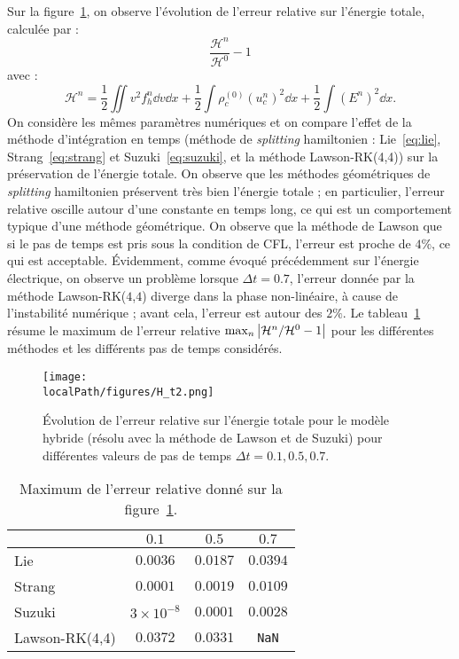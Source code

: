 Sur la figure~\ref{fig:H:t2}, on observe l'évolution de l'erreur relative sur l'énergie totale, calculée par :
\begin{equation}
	\frac{\mathcal{H}^n}{\mathcal{H}^0}-1
	\label{eq:relativeerror:H}
\end{equation}
avec :
$$
  \mathcal{H}^n = \frac{1}{2}\iint v^2f_h^n\dd{v}\dd{x}
                + \frac{1}{2}\int\rho_c^{(0)}\left(u_c^n\right)^2\dd{x}
                + \frac{1}{2}\int\left(E^n\right)^2\dd{x}.
$$
On considère les mêmes paramètres numériques et on compare l'effet de la méthode d'intégration en temps (méthode de \emph{splitting} hamiltonien : Lie~\eqref{eq:lie}, Strang~\eqref{eq:strang} et Suzuki~\eqref{eq:suzuki}, et la méthode Lawson-RK(4,4)) sur la préservation de l'énergie totale. On observe que les méthodes géométriques de \emph{splitting} hamiltonien préservent très bien l'énergie totale ; en particulier, l'erreur relative oscille autour d'une constante en temps long, ce qui est un comportement typique d'une méthode géométrique. On observe que la méthode de Lawson que si le pas de temps est pris sous la condition de CFL, l'erreur est proche de $4\%$, ce qui est acceptable. Évidemment, comme évoqué précédemment sur l'énergie électrique, on observe un problème lorsque $\Delta t=0.7$, l'erreur donnée par la méthode Lawson-RK($4$,$4$) diverge dans la phase non-linéaire, à cause de l'instabilité numérique ; avant cela, l'erreur est autour des $2\%$. Le tableau~\ref{tab:H:max} résume le maximum de l'erreur relative $\max_n \left| {\cal H}^n / {\cal H}^0 -1 \right|$ pour les différentes méthodes et les différents pas de temps considérés.

\begin{figure}[h]
  \centering
  \texttt{[image: \\localPath/figures/H\_t2.png]}
  \caption{Évolution de l'erreur relative sur l'énergie totale pour le modèle hybride (résolu avec la méthode de Lawson et de Suzuki) pour différentes valeurs de pas de temps $\Delta t=0.1,0.5,0.7$.}
  \label{fig:H:t2}
\end{figure}

\begin{table}[h]
  \centering
  \begin{tabular}{l|c|c|c}
                   & $0.1$             & $0.5$     & $0.7$        \\
    \hline
    Lie            & $0.0036$          & $0.0187$  & $0.0394$     \\
    Strang         & $0.0001$          & $0.0019$  & $0.0109$     \\
    Suzuki         & $3\times 10^{-8}$ & $0.0001$  & $0.0028$     \\
    Lawson-RK(4,4) & $0.0372$          & $0.0331$  & \texttt{NaN} \\
  \end{tabular}
  \caption{Maximum de l'erreur relative donné sur la figure~\ref{fig:H:t2}.}
  \label{tab:H:max}
\end{table}

